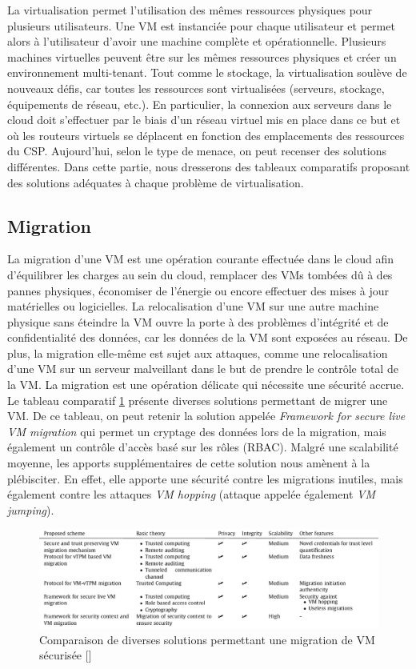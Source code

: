 La virtualisation permet l’utilisation des mêmes ressources physiques pour
plusieurs utilisateurs. Une VM est instanciée pour chaque utilisateur et permet
alors à l’utilisateur d’avoir une machine complète et opérationnelle. Plusieurs machines virtuelles peuvent être sur les mêmes ressources physiques et créer un environnement multi-tenant.
Tout comme le stockage, la virtualisation soulève de nouveaux défis, car toutes
les ressources sont virtualisées (serveurs, stockage, équipements de réseau, etc.). En particulier, la connexion aux serveurs dans le cloud doit s'effectuer par le biais d'un réseau virtuel mis en place dans ce but et où les routeurs virtuels se déplacent en fonction des emplacements des ressources du CSP. Aujourd'hui, selon le type de menace, on peut recenser des solutions différentes. Dans cette partie, nous dresserons des tableaux comparatifs proposant des solutions adéquates à chaque problème de virtualisation.

\subsection{Migration}
La migration d'une VM est une opération courante effectuée dans le cloud afin d'équilibrer les charges au sein du cloud, remplacer des VMs tombées dû à des pannes physiques, économiser de l'énergie ou encore effectuer des mises à jour matérielles ou logicielles. 
La relocalisation d'une VM sur une autre machine physique sans éteindre la VM ouvre la porte à des problèmes d'intégrité et de confidentialité des données, car les données de la VM sont exposées au réseau. De plus, la migration elle-même est sujet aux attaques, comme une relocalisation d'une VM sur un serveur malveillant dans le but de prendre le contrôle total de la VM. La migration est une opération délicate qui nécessite une sécurité accrue. Le tableau comparatif \ref{label-image12} présente diverses solutions permettant de migrer une VM. De ce tableau, on peut retenir la solution appelée \textit{Framework for secure live VM migration} qui permet un cryptage des données lors de la migration, mais également un contrôle d'accès basé sur les rôles (\gls{RBAC}). Malgré une scalabilité moyenne, les apports supplémentaires de cette solution nous amènent à la plébisciter. En effet, elle apporte une sécurité contre les migrations inutiles, mais également contre les attaques \textit{\gls{VM hopping}} (attaque appelée également \textit{VM jumping}).

\begin{figure}[h]
	\center
	\includegraphics[width=15.5cm]{./pics/VM_migration_tableau.png}
	\caption{Comparaison de diverses solutions permettant une migration de VM sécurisée [\cite{security_cloud_survey}]}
	\label{label-image12}
\end{figure}

